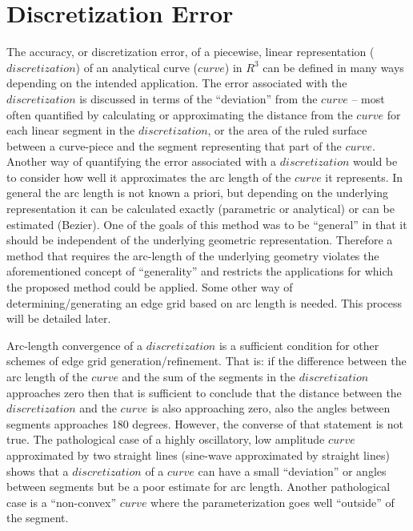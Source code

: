 \section{Discretization Error}
The accuracy, or discretization error, of a piecewise, linear representation ($discretization$) of an analytical curve ($curve$) in $R^3$ can be defined in many ways depending on the intended application.  The error associated with the $discretization$ is discussed in terms of the ``deviation'' from the $curve$ -- most often quantified by calculating or approximating the distance from the $curve$ for each linear segment in the $discretization$, or the area of the ruled surface between a curve-piece and the segment representing that part of the $curve$.  Another way of quantifying the error associated with a $discretization$ would be to consider how well it approximates the arc length of the $curve$ it represents.  In general the arc length is not known a priori, but depending on the underlying representation it can be calculated exactly (parametric or analytical) or can be estimated (Bezier).  One of the goals of this method was to be ``general'' in that it should be independent of the underlying geometric representation.  Therefore a method that requires the arc-length of the underlying geometry violates the aforementioned concept of ``generality'' and restricts the applications for which the proposed method could be applied.  Some other way of determining/generating an edge grid based on arc length is needed.  This process will be detailed later.

Arc-length convergence of a $discretization$ is a sufficient condition for other schemes of edge grid generation/refinement.  That is: if the difference between the arc length of the $curve$ and the sum of the segments in the $discretization$ approaches zero then that is sufficient to conclude that the distance between the $discretization$ and the $curve$ is also approaching zero, also the angles between segments approaches 180 degrees.  However, the converse of that statement is not true.  The pathological case of a highly oscillatory, low amplitude $curve$ approximated by two straight lines (sine-wave approximated by straight lines) shows that a $discretization$ of a $curve$ can have a small ``deviation'' or angles between segments but be a poor estimate for arc length.  Another pathological case is a ``non-convex'' $curve$ where the parameterization goes well ``outside'' of the segment.
